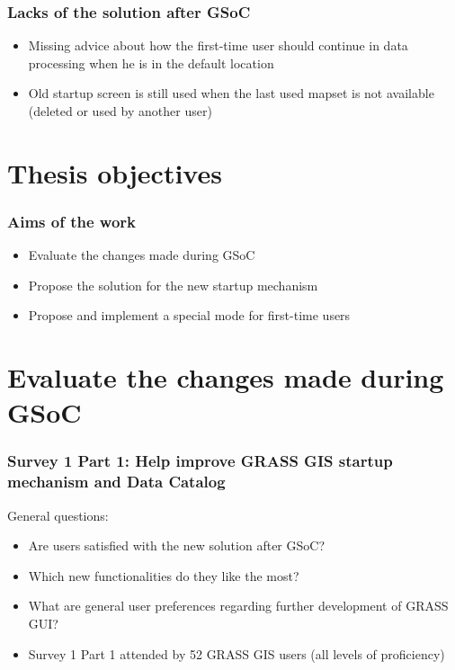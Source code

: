 \documentclass[aspectratio=169]{beamer}
\begin{document}
\begin{frame}
\frametitle{Lacks of the solution after GSoC}
\begin{itemize}
\item Missing advice about how the first-time user should continue in data processing when he is in the default location
\vspace{0.5cm}
\item Old startup screen is still used when the last used mapset is not available (deleted or used by another user)
\end{itemize}
\end{frame}


\section{Thesis objectives}

\begin{frame}
\frametitle{Aims of the work}
\begin{itemize}
\item Evaluate the changes made during GSoC
\vspace{1cm}
\item Propose the solution for the new startup mechanism
\vspace{1cm}
\item Propose and implement a special mode for first-time users
\end{itemize}
\end{frame}


\section{Evaluate the changes made during GSoC}

\begin{frame}
\frametitle{Survey 1 Part 1: Help improve GRASS GIS startup mechanism and Data Catalog}
General questions:
\begin{itemize}
\item Are users satisfied with the new solution after GSoC?
\item Which new functionalities do they like the most?
\item What are general user preferences regarding further development of GRASS GUI?
\vspace{0.5cm}
\item Survey 1 Part 1 attended by 52 GRASS GIS users (all levels of proficiency)
\end{itemize}
\end{frame}
\end{document}
